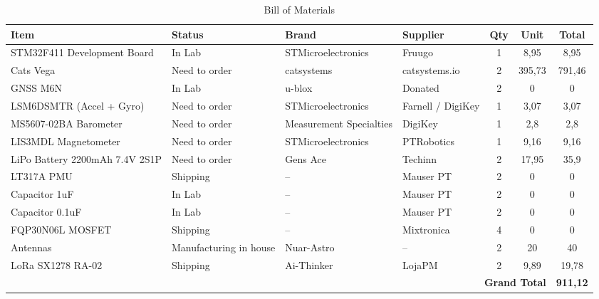 \begin{landscape}
\begin{table}[ht]
\centering
\caption{Bill of Materials}
\small
\begin{tabular}{|l|l|l|l|c|c|c|}
\hline
\textbf{Item} & \textbf{Status} & \textbf{Brand} & \textbf{Supplier} & \textbf{Qty} & \textbf{Unit} & \textbf{Total} \\
\hline

STM32F411 Development Board &
In Lab &
STMicroelectronics &
Fruugo &
1 &
8,95 &
8,95 \\
\hline

Cats Vega &
Need to order &
catsystems &
catsystems.io &
2 &
395,73 &
791,46 \\
\hline

GNSS M6N &
In Lab &
u-blox &
Donated &
2 &
0 &
0 \\
\hline

LSM6DSMTR (Accel + Gyro) &
Need to order &
STMicroelectronics &
Farnell / DigiKey &
1 &
3,07 &
3,07 \\
\hline

MS5607-02BA Barometer &
Need to order &
Measurement Specialties &
DigiKey &
1 &
2,8 &
2,8 \\
\hline

LIS3MDL Magnetometer &
Need to order &
STMicroelectronics &
PTRobotics &
1 &
9,16 &
9,16 \\
\hline

LiPo Battery 2200mAh 7.4V 2S1P &
Need to order &
Gens Ace &
Techinn &
2 &
17,95 &
35,9 \\
\hline

LT317A PMU &
Shipping &
-- &
Mauser PT &
2 &
0 &
0 \\
\hline

Capacitor 1uF &
In Lab &
-- &
Mauser PT &
2 &
0 &
0 \\
\hline

Capacitor 0.1uF &
In Lab &
-- &
Mauser PT &
2 &
0 &
0 \\
\hline

FQP30N06L MOSFET &
Shipping &
-- &
Mixtronica &
4 &
0 &
0 \\
\hline

Antennas &
Manufacturing in house &
Nuar-Astro &
-- &
2 &
20 &
40 \\
\hline

LoRa SX1278 RA-02 &
Shipping &
Ai-Thinker &
LojaPM &
2 &
9,89 &
19,78 \\
\hline
\multicolumn{6}{|r|}{\textbf{Grand Total}} & \textbf{911,12} \\
\hline
\end{tabular}

\end{table}
\end{landscape}